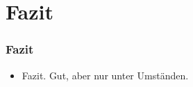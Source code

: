 \section{Fazit}
\begin{frame}
\frametitle{Fazit}
    \begin{itemize}
        \item Fazit. Gut, aber nur unter Umständen.
    \end{itemize}
\end{frame}
